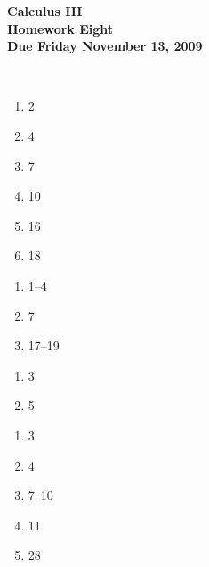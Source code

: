 \documentclass[12pt]{article}
\begin{document}
\pagestyle{empty}
 
\begin{center}
{\large {\bf Calculus III}}\\
\medskip
{\large {\bf Homework Eight}}\\
\medskip
{ {\bf Due Friday November 13, 2009}}\\
\end{center}

\hspace{2mm}\\




\begin{enumerate}
\setlength{\itemsep}{-1mm}
  \item 2
  \item 4
  \item 7
  \item 10
  \item 16
  \item 18
\end{enumerate}


\begin{enumerate}
\setlength{\itemsep}{-1mm}
  \item 1--4
  \item 7
  \item 17--19
\end{enumerate}

\begin{enumerate}
\setlength{\itemsep}{-1mm}
  \item 3
  \item 5
\end{enumerate}


\begin{enumerate}
\setlength{\itemsep}{-1mm}
  \item 3
  \item 4
  \item 7--10
  \item 11
  \item 28
\end{enumerate}
\end{document}
